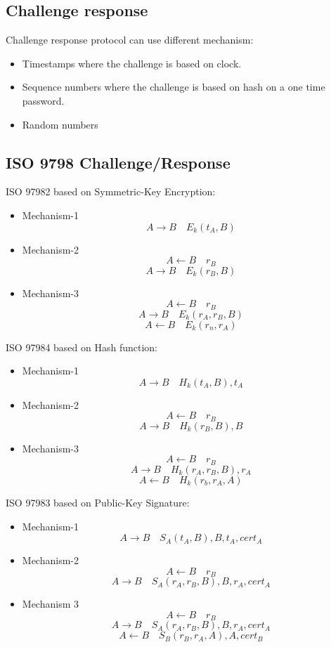 \subsection{Challenge response}
Challenge response protocol can use different mechanism:
\begin{itemize}
    \item Timestamps where the challenge is based on clock.
    \item Sequence numbers where the challenge is based on hash on a
    one time password.
    \item Random numbers
\end{itemize}

\subsection{ISO 9798 Challenge/Response}
ISO 9798\text{-}2 based on Symmetric-Key Encryption:
\begin{itemize}
    \item Mechanism-1
    		$$ A  \rightarrow B \quad E_k(t_A,B) $$
    \item Mechanism-2
    		$$ A  \leftarrow  B \quad r_B $$
    		$$ A  \rightarrow B \quad E_k(r_B,B) $$
    \item Mechanism-3
    		$$ A  \leftarrow B \quad r_B $$
    		$$ A  \rightarrow B \quad E_k(r_A,r_B,B) $$
    		$$ A  \leftarrow  B \quad E_k(r_n,r_A) $$
\end{itemize}
ISO 9798\text{-}4 based on Hash function:
\begin{itemize}
    \item Mechanism-1
    $$ A \rightarrow B \quad H_k(t_A,B),t_A $$
    \item Mechanism-2
    $$ A \leftarrow B \quad r_B $$
    $$ A \rightarrow B \quad H_k(r_B,B),B $$
    \item Mechanism-3
    $$ A \leftarrow B \quad r_B $$
    $$ A \rightarrow B \quad H_k(r_A,r_B,B),r_A $$
    $$ A \leftarrow B \quad H_k(r_b,r_A,A) $$
\end{itemize}
ISO 9798\text{-}3 based on Public-Key Signature:
\begin{itemize}
    \item Mechanism-1
    $$ A \rightarrow B \quad S_A(t_A,B),B,t_A,cert_A $$
    \item Mechanism-2
    $$ A \leftarrow B \quad r_B$$
    $$ A \rightarrow B \quad S_A(r_A,r_B,B),B,r_A,cert_A $$
    \item Mechanism 3
    $$ A \leftarrow B \quad r_B $$
    $$ A \rightarrow B \quad S_A(r_A,r_B,B),B,r_A,cert_A $$
    $$ A \leftarrow B \quad S_B(r_B,r_A,A),A,cert_B $$
\end{itemize}
